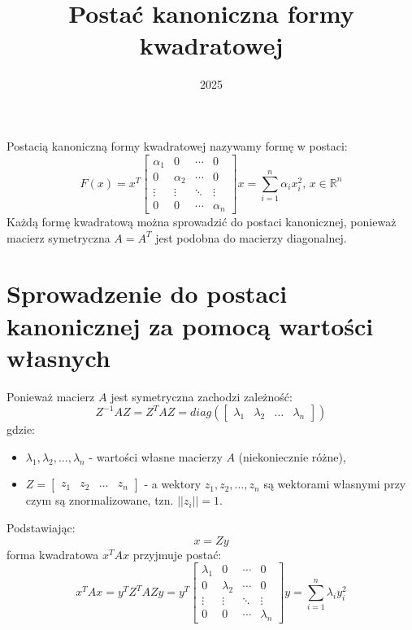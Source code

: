 \documentclass{article}
\title{Postać kanoniczna formy kwadratowej}
\date{2025}
\begin{document}
\maketitle

Postacią kanoniczną formy kwadratowej nazywamy formę w postaci:
$$
    F(x)
    =
    x^{T}
    \begin{bmatrix} 
        \alpha_{1} & 0 & \cdots & 0\\
        0 & \alpha_{2} & \cdots & 0\\
        \vdots & \vdots & \ddots & \vdots\\
        0 & 0 & \cdots & \alpha_{n}
    \end{bmatrix}
    x
    =
    \sum_{i = 1}^{n}{\alpha_{i}x_{i}^{2}},\, x \in \mathbb{R}^{n}
$$
Każdą formę kwadratową można sprowadzić do postaci kanonicznej, ponieważ macierz symetryczna $A = A^{T}$ jest podobna do macierzy diagonalnej.

\section{Sprowadzenie do postaci kanonicznej za pomocą wartości własnych}
Ponieważ macierz $A$ jest symetryczna zachodzi zależność:
$$
    Z^{-1}AZ = Z^{T}AZ = diag(
    \begin{bmatrix}
        \lambda_{1} & \lambda_{2} & \dots & \lambda_{n}
    \end{bmatrix})
$$
gdzie:
\begin{itemize}
    \item $\lambda_{1}, \lambda_{2}, \dots, \lambda_{n}$ - wartości własne macierzy $A$ (niekoniecznie różne),
    \item $Z = \begin{bmatrix}
        z_{1} & z_{2} & \dots & z_{n}
    \end{bmatrix}$ - a wektory $z_{1}, z_{2}, \dots, z_{n}$ są wektorami własnymi przy czym są znormalizowane, tzn. $||z_{i}|| = 1$.
\end{itemize}
Podstawiając:
$$
    x = Zy
$$
forma kwadratowa $x^{T}Ax$ przyjmuje postać:
$$
    x^{T}Ax = y^{T}Z^{T}AZy = 
    y^{T}
    \begin{bmatrix} 
        \lambda_{1} & 0 & \cdots & 0\\
        0 & \lambda_{2} & \cdots & 0\\
        \vdots & \vdots & \ddots & \vdots\\
        0 & 0 & \cdots & \lambda_{n}
    \end{bmatrix}
    y
    =
    \sum_{i = 1}^{n}{\lambda_{i}y_{i}^{2}}
$$
\end{document}

